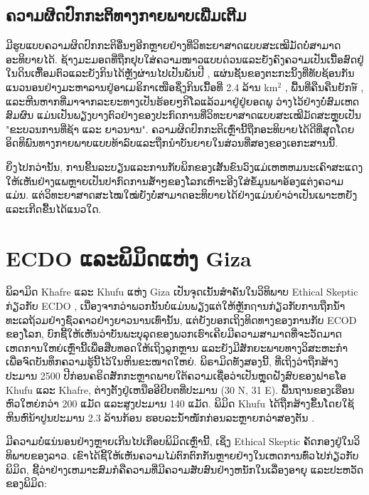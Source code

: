 \documentclass[10pt,twocolumn,letterpaper]{article}
\begin{document}
\subsection{ຄວາມຜິດປົກກະຕິທາງກາຍພາບເພີ່ມເຕີມ}

ມີຮູບແບບຄວາມຜິດປົກກະຕິອື່ນໆອີກຫຼາຍຢ່າງທີ່ວິທະຍາສາດແບບສະເໝີມັດບໍ່ສາມາດອະທິບາຍໄດ້. ຊ້າງມະມອດທີ່ຖືກຢຸບໃສ່ຄວາມໜາວແບບດ່ວນແລະຍັງຄົງຄວາມເປັນເນື້ອສົດຢູ່ໃນດິນເຫື້ອມຕົວແລະຍັງກິນໄດ້ຫຼັງຜ່ານໄປເປັນພັນປີ \cite{17,18,19}, ແຜ່ນຊັ້ນຂອງຕະກະນິ້ງທີ່ທັບຊ້ອນກັນແນວນອນຢ່າງມະຫາລານຢູ່ອາເມຣິກາເໜືອຊຶ່ງກິນເນື້ອທີ່ 2.4 ລ້ານ km$^2$ \cite{21}, ພື້ນທີ່ຄືນຄືນຍັກษ໌ \cite{22}, ແລະຫີນຫາກທີ່ມາຈາກລະຍະທາງເປັນຮ້ອຍໆກິໂລແລ້ວມາຢູ່ຢູ່ຍອດພູ \cite{23,26} ວ່າງໄວ້ຢ່າງບໍ່ສົມເຫດສົມຜົນ ແມ່ນເປັນພຽງບາງຕົວຢ່າງຂອງປະກົດການທີ່ວິທະຍາສາດແບບສະເໝີມັດສະຫຼຸບເປັນ "ຂະບວນການທີ່ຊ້າ ແລະ ຍາວນານ". ຄວາມຜິດປົກກະຕິເຫຼົ່ານີ້ຖືກອະທິບາຍໄດ້ດີທີ່ສຸດໂດຍອິດທິພົນທາງກາຍພາບແບບທ້າລົບແລະຖືກນຳບັນຍາຍໃນສ່ວນທີ່ສອງຂອງເອກະສານນີ້.

ຍິ່ງໄປກວ່ານັ້ນ, ການຂີ້ນລະບຽນແລະການກັບພິກຂອງເສັ້ນຂົນວົງແມ່ເຫຫຫມນະເຄົາສະແດງໃຫ້ເຫັນຢ່າງແພຫຼາຍເປັນປາກົດການສ້ຳໆຂອງໂລກເຫົາະອີງໃສ່ຂໍ້ມູນພາອ້ອງແຕ່ງຄວາມແມ່ນ\cite{35,40,41}. ແຕ່ວິທະຍາສາດສະໄໝໃໝ່ຍັງບໍ່ສາມາດອະທິບາຍໄດ້ຢ່າງແມ່ນຍຳວ່າເປັນເພາະຫຍັງແລະເກີດຂື້ນໄດ້ແນວໃດ.

\section{ECDO ແລະພິມິດແຫ່ງ Giza}

ພິລາມິດ Khafre ແລະ Khufu ແຫ່ງ Giza ເປັນຈຸດເນັ້ນສຳຄັນໃນວິທິພາບ Ethical Skeptic ກ່ຽວກັບ ECDO \cite{27}, ເນື່ອງຈາກວ່າພວກນັ້ນບໍ່ແມ່ນພຽງແຕ່ໃຫ້ຫຼັກຐານກ່ຽວກັບການຖືກນ້ຳທະເລຖ້ວມຢ່າງຊົ່ວຄາວຢ່າງຍາວນານເທົ່ານັ້ນ, ແຕ່ຍັງບອກເຖິງທິດທາງຂອງການກັບ ECOD ຂອງໂລກ, ບົກຊີ້ໃຫ້ເຫັນວ່າບັນພະບຸລຸດຂອງພວກເຮົາເຄີຍມີຄວາມສາມາດທີ່ຈະວັດມາດເຫດການໃຫຍ່ເຫຼົ່ານີ້ເພື່ອສືບທອດໃຫ້ເຖິງລູກຫຼານ ແລະຍັງມີສັກຍະພາບທາງວິສະຫະກຳເພື່ອຈົດບັນທຶກຄວາມຮູ້ນີ້ໄວ້ໃນຫິນຂະໜາດໃຫຍ່. ພິຣາມິດທັງສອງນີ້, ທີ່ເຖິງວ່າຖືກສ້າງປະມານ 2500 ປີກ່ອນຄຣິດສັກກະຫຼາດພາຍໃຕ້ຄວາມເຊື່ອວ່າເປັນຫຼຸດຝັງສົບຂອງຟາຣໂອ Khufu ແລະ Khafre, ຕ່າງຕັ້ງຢູ່ເຫນືອອີຢິບຕທີ່ປະມານ (30 N, 31 E). ພື້ນຖານຂອງເຮືອນຫົວໃຫຍ່ກວ່າ 200 ແມັດ ແລະສູງປະມານ 140 ແມັດ. ພິມິດ Khufu ໄດ້ຖືກສ້າງຂຶ້ນໂດຍໃຊ້ຫິນຫົນ້າປູນປະມານ 2.3 ລ້ານກ້ອນ ຮອບລະນ້ຳໜັກກ່ອນລະຫຼາຍກວ່າສອງຕັນ \cite{24, 25}.

ມີຄວາມບໍ່ແນ່ນອນຢ່າງຫຼາຍເກີນໄປເກືອບພິມິດເຫຼົ່ານີ້, ເຊິ່ງ Ethical Skeptic ຄັດກອງຢູ່ໃນວິທິພາບຂອງລາວ. ເຂົາໄດ້ຊີ້ໃຫ້ເຫັນຄວາມໄມ່ຕົກຕົກກັນຫຼາຍຢ່າງໃນເຫດການທົ່ວໄປກ່ຽວກັບພິມິດ, ຊີ້ວ່າຢ່າງເຫມາະສົມກໍຄືຄວາມທີ່ມີຄວາມສັບສົນຢ່າງຫນັກໃນເລື່ອງອາຍຸ ແລະປະຫວັດຂອງພິມິດ:
\end{document}
